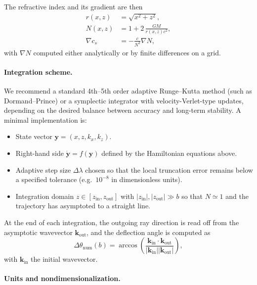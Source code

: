 \documentclass[11pt]{article}
\begin{document}
The refractive index and its gradient are then
\begin{align}
  r(x,z) &= \sqrt{x^2 + z^2},\\
  N(x,z) &= 1 + 2\,\frac{GM}{r(x,z) c^2},\\
  \nabla c_s &= -\frac{c}{N^2}\nabla N,
\end{align}
with $\nabla N$ computed either analytically or by finite differences
on a grid.

\paragraph{Integration scheme.}

We recommend a standard 4th–5th order adaptive Runge--Kutta method (such
as Dormand–Prince) or a symplectic integrator with velocity-Verlet-type
updates, depending on the desired balance between accuracy and long-term
stability.
A minimal implementation is:

\begin{itemize}
  \item State vector
        $\mathbf{y} = (x,z,k_x,k_z)$.
  \item Right-hand side $\dot{\mathbf{y}} = f(\mathbf{y})$ defined by the
        Hamiltonian equations above.
  \item Adaptive step size $\Delta\lambda$ chosen so that the local
        truncation error remains below a specified tolerance (e.g.\
        $10^{-8}$ in dimensionless units).
  \item Integration domain $z \in [z_\mathrm{in}, z_\mathrm{out}]$ with
        $|z_\mathrm{in}|, |z_\mathrm{out}| \gg b$ so that
        $N \simeq 1$ and the trajectory has asymptoted to a straight line.
\end{itemize}

At the end of each integration, the outgoing ray direction is read off
from the asymptotic wavevector $\mathbf{k}_\mathrm{out}$, and the
deflection angle is computed as
\begin{equation}
  \Delta\theta_{\text{num}}(b)
  = \arccos\!\left(
      \frac{\mathbf{k}_\mathrm{in}\cdot\mathbf{k}_\mathrm{out}}
           {|\mathbf{k}_\mathrm{in}||\mathbf{k}_\mathrm{out}|}
    \right),
\end{equation}
with $\mathbf{k}_\mathrm{in}$ the initial wavevector.

\paragraph{Units and nondimensionalization.}
\end{document}
